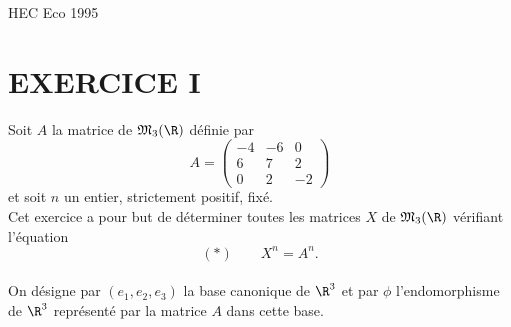 \documentclass[11pt]{article}%
\begin{document}
\begin{center}
{\huge HEC Eco 1995}
\end{center}

\section*{EXERCICE I}

Soit $A$ la matrice de $\mathfrak{M}_{3}(\R)$ définie par 
\[
A = \left( 
\begin{array}{ccc}
-4 & -6 & 0 \\
6 & 7 & 2 \\
0 & 2 & -2
\end{array}
\right) 
\]
et soit $n$ un entier, strictement positif, fixé. \\

Cet exercice a pour but de déterminer toutes les matrices $X$ de
$\mathfrak{M}_{3}(\R)$ vérifiant l'équation 
\[
(\ast )\qquad X^{n} = A^{n}.
\]
\\
On désigne par $(e_{1},e_{2},e_{3})$ la base canonique de $\R^{3}$
et par $\phi $ l'endomorphisme de $\R^{3}$ représenté par la matrice 
$A$ dans cette base.
\end{document}
